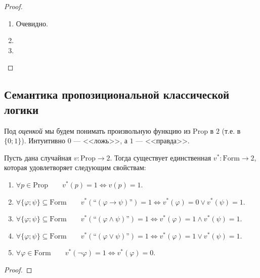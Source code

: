 \documentclass[12pt,a4paper]{article}
\newcommand{\Prop}{\ensuremath{\mathrm{Prop}}\xspace}
\newcommand{\Formul}{\ensuremath{\mathrm{Form}}\xspace}
\begin{document}
    \begin{proof}
        \begin{enumerate}
            \item Очевидно.
            \item {}
            \item {}
        \end{enumerate}
    \end{proof}

    \subsection{Семантика пропозициональной классической логики}

    \begin{definition}
        Под \emph{оценкой} мы будем понимать произвольную функцию из $\Prop$ в $2$ (т.е. в $\{0; 1\}$). Интуитивно $0$ --- <<ложь>>, а $1$ --- <<правда>>.
    \end{definition}

    \begin{theorem}
        Пусть дана случайная $v: \Prop \to 2$. Тогда существует единственная $v^*: \Formul \to 2$, которая удовлетворяет следующим свойствам:
        \begin{enumerate}
            \item $\forall p \in \Prop\qquad v^*(p) = 1 \Leftrightarrow v(p) = 1$.
            \item $\forall \{\varphi; \psi\} \subseteq \Formul\qquad v^*(\text{``$(\varphi \rightarrow \psi)$''}) = 1 \Leftrightarrow v^*(\varphi) = 0 \vee v^*(\psi) = 1$.
            \item $\forall \{\varphi; \psi\} \subseteq \Formul\qquad v^*(\text{``$(\varphi \wedge \psi)$''}) = 1 \Leftrightarrow v^*(\varphi) = 1 \wedge v^*(\psi) = 1$.
            \item $\forall \{\varphi; \psi\} \subseteq \Formul\qquad v^*(\text{``$(\varphi \vee \psi)$''}) = 1 \Leftrightarrow v^*(\varphi) = 1 \vee v^*(\psi) = 1$.
            \item $\forall \varphi \in \Formul\qquad v^*(\neg \varphi) = 1 \Leftrightarrow v^*(\varphi) = 0$.
        \end{enumerate}
    \end{theorem}

    \begin{proof}
    \end{proof}
\end{document}
